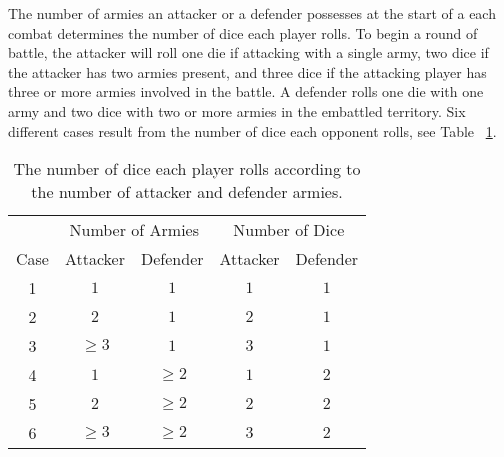 \documentclass[12pt]{article}
\begin{document}
The number of armies an attacker or a defender possesses at the start of
a each combat determines the number of dice each player rolls.  To begin
a round of battle, the attacker will roll one die if attacking with a
single army, two dice if the attacker has two armies present, and three
dice if the attacking player has three or more armies involved in the
battle.  A defender rolls one die with one army and two dice with two or
more armies in the embattled territory.  Six different cases result from
the number of dice each opponent rolls, see Table~%
\ref{tab:riskgame:riskdice}.

\begin{table}
    \centering
    \begin{tabular}{ccccc}
             & \multicolumn{2}{c}{Number of Armies} & \multicolumn{2}{c}{Number of Dice} \\ 
        Case & Attacker & Defender & Attacker & Defender \\ 
        1    & $1$      & $1$      & $1$      & $1$      \\ 
        2    & $2$      & $1$      & $2$      & $1$      \\ 
        3    & $ \ge 3$ & $1$      & $3$      & $1$      \\ 
        4    & $1$      & $ \ge 2$ & $1$      & $2$      \\ 
        5    & $2$      & $ \ge 2$ & $2$      & $2$      \\ 
        6    & $ \ge 3$ & $ \ge 2$ & $3$      & $2$      \\ 
    \end{tabular}
    \caption{The number of dice each player rolls according to the
    number of attacker and defender armies.}%
    \label{tab:riskgame:riskdice}
\end{table}
\end{document}
